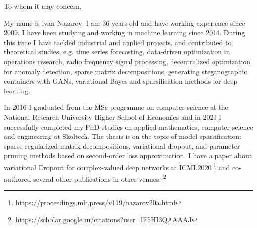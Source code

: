 \documentclass[14pt]{letter}
\begin{document}
\thispagestyle{empty}

%

\vspace{1.5cm}

\begin{minipage}{0.5\linewidth}
To whom it may concern, \par
\end{minipage} \par\bigskip

My name is Ivan Nazarov. I am {36} years old and have working experience since 2009.
I have been studying and working in machine learning since 2014. During this time I
have tackled industrial and applied projects, and contributed to theoretical studies,
e.g. time series forecasting, data-driven optimization in operations research, radio
frequency signal processing, decentralized optimization for anomaly detection, sparse
matrix decompositions, generating steganographic containers with GANs, variational
Bayes and sparsification methods for deep learning.
\par\medskip

In 2016 I graduated from the MSc programme on computer science at the National Research
University Higher School of Economics and in 2020 I successfully completed my PhD studies
on applied mathematics, computer science and engineering at Skoltech. The thesis is on
the topic of model sparsification: sparse-regularized matrix decompositions, variational
dropout, and parameter pruning methods based on second-order loss approximation. I have
a paper about variational Dropout for complex-valued deep networks at ICML2020%
\footnote{
    \url{https://proceedings.mlr.press/v119/nazarov20a.html}
} and co-authored several other publications in other venues.%
\footnote{
    \url{https://scholar.google.ru/citations?user=lF5HI3QAAAAJ}
}
\par\medskip
\end{document}
